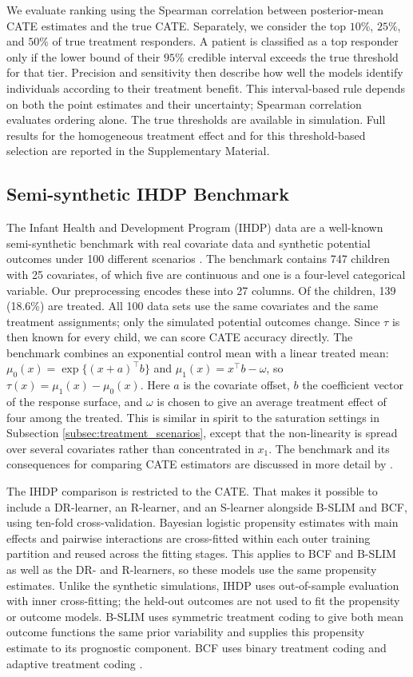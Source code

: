 \documentclass[12pt]{article}
\begin{document}
We evaluate ranking using the Spearman correlation between posterior-mean CATE estimates and the true CATE. Separately, we consider the top $10\%$, $25\%$, and $50\%$ of true treatment responders. A patient is classified as a top responder only if the lower bound of their $95\%$ credible interval exceeds the true threshold for that tier. Precision and sensitivity then describe how well the models identify individuals according to their treatment benefit. This interval-based rule depends on both the point estimates and their uncertainty; Spearman correlation evaluates ordering alone. The true thresholds are available in simulation. Full results for the homogeneous treatment effect and for this threshold-based selection are reported in the Supplementary Material.

\subsection{Semi-synthetic IHDP Benchmark}
\label{subsec:ihdp_setting}
The Infant Health and Development Program (IHDP) data are a well-known semi-synthetic benchmark with real covariate data and synthetic potential outcomes under 100 different scenarios \citep{ihdp1990trial,hill2011bayesian}. The benchmark contains 747 children with 25 covariates, of which five are continuous and one is a four-level categorical variable. Our preprocessing encodes these into 27 columns. Of the children, 139 (18.6\%) are treated. All 100 data sets use the same covariates and the same treatment assignments; only the simulated potential outcomes change. Since $\tau$ is then known for every child, we can score CATE accuracy directly. The benchmark combines an exponential control mean with a linear treated mean: $\mu_0(x)=\exp\{(x+a)^\top b\}$ and $\mu_1(x)=x^\top b-\omega$, so $\tau(x)=\mu_1(x)-\mu_0(x)$. Here $a$ is the covariate offset, $b$ the coefficient vector of the response surface, and $\omega$ is chosen to give an average treatment effect of four among the treated. This is similar in spirit to the saturation settings in Subsection \ref{subsec:treatment_scenarios}, except that the non-linearity is spread over several covariates rather than concentrated in $x_1$. The benchmark and its consequences for comparing CATE estimators are discussed in more detail by \citet{curth2021really}.

The IHDP comparison is restricted to the CATE. That makes it possible to include a DR-learner, an R-learner, and an S-learner alongside B-SLIM and BCF, using ten-fold cross-validation. Bayesian logistic propensity estimates with main effects and pairwise interactions are cross-fitted within each outer training partition and reused across the fitting stages. This applies to BCF and B-SLIM as well as the DR- and R-learners, so these models use the same propensity estimates. Unlike the synthetic simulations, IHDP uses out-of-sample evaluation with inner cross-fitting; the held-out outcomes are not used to fit the propensity or outcome models. B-SLIM uses symmetric treatment coding to give both mean outcome functions the same prior variability and supplies this propensity estimate to its prognostic component. BCF uses binary treatment coding and adaptive treatment coding \citep{hahn2020bayesian}.
\end{document}

